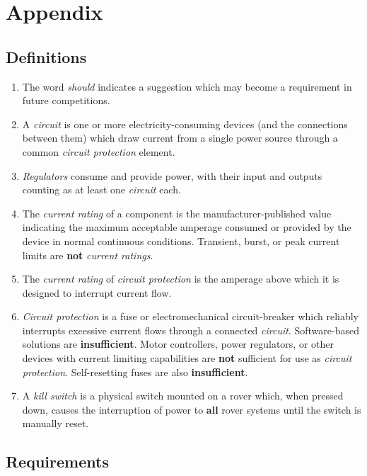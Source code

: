 \section{Appendix}
\subsection{Definitions}

    \begin{enumerate}
        \item The word \textit{should} indicates a suggestion which may become a requirement in future competitions.
        \item A \textit{circuit} is one or more electricity-consuming devices (and the connections between them) which draw current from a single power source through a common \textit{circuit protection} element.
        \item \textit{Regulators} consume and provide power, with their input and outputs counting as at least one \textit{circuit} each.
        \item The \textit{current rating} of a component is the manufacturer-published value indicating the maximum acceptable amperage consumed or provided by the device in normal continuous conditions. Transient, burst, or peak current limits are \textbf{not} \textit{current ratings}.
        \item The \textit{current rating} of \textit{circuit protection} is the amperage above which it is designed to interrupt current flow.
        \item \textit{Circuit protection} is a fuse or electromechanical circuit-breaker which reliably interrupts excessive current flows through a connected \textit{circuit}. Software-based solutions are \textbf{insufficient}. Motor controllers, power regulators, or other devices with current limiting capabilities are \textbf{not} sufficient for use as \textit{circuit protection}. Self-resetting fuses are also \textbf{insufficient}.
        \item A \textit{kill switch} is a physical switch mounted on a rover which, when pressed down, causes the interruption of power to \textbf{all} rover systems until the switch is manually reset.
    \end{enumerate}

    \clearpage %
    
    \subsection{Requirements}

